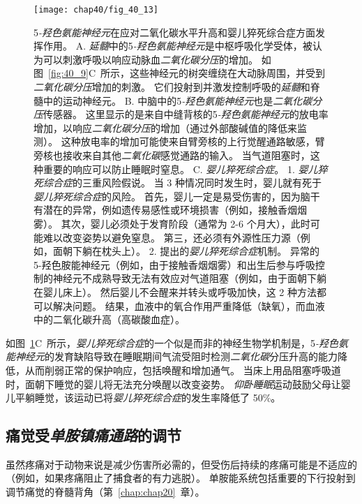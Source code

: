 \begin{figure}[htbp]
	\centering
	\texttt{[image: chap40/fig\_40\_13]}
	\caption{5\textit{-羟色氨能神经元}在应对二氧化碳水平升高和婴儿猝死综合症方面发挥作用。
		A. \textit{延髓}中的5\textit{-羟色氨能神经元}是中枢呼吸化学受体，被认为可以刺激呼吸以响应动脉血\textit{二氧化碳分压}的增加。
		如图~\ref{fig:40_9}C~所示，这些神经元的树突缠绕在大动脉周围，并受到\textit{二氧化碳分压}增加的刺激。
		它们投射到并激发控制呼吸的\textit{延髓}和脊髓中的运动神经元。
		B. 中脑中的5\textit{-羟色氨能神经元}也是\textit{二氧化碳分压}传感器。
		这里显示的是来自中缝背核的5\textit{-羟色氨能神经元}的放电率增加，以响应\textit{二氧化碳分压}的增加（通过外部酸碱值的降低来监测）。
		这种放电率的增加可能使来自臂旁核的上行觉醒通路敏感，臂旁核也接收来自其他\textit{二氧化碳}感觉通路的输入。
		当气道阻塞时，这种重要的响应可以防止睡眠时窒息\cite{richerson2004serotonergic}。
		C. \textit{婴儿猝死综合症}。
		1. \textit{婴儿猝死综合症}的三重风险假说。
		当 3 种情况同时发生时，婴儿就有死于\textit{婴儿猝死综合症}的风险。
		首先，婴儿一定是易受伤害的，因为脑干有潜在的异常，例如遗传易感性或环境损害（例如，接触香烟烟雾）。
		其次，婴儿必须处于发育阶段（通常为 2-6 个月大），此时可能难以改变姿势以避免窒息。
		第三，还必须有外源性压力源（例如，面朝下躺在枕头上）\cite{filiano1994perspective}。
		2. 提出的\textit{婴儿猝死综合症}机制。
		异常的 5-羟色胺能神经元（例如，由于接触香烟烟雾）和出生后参与呼吸控制的神经元不成熟导致无法有效应对气道阻塞（例如，由于面朝下躺在婴儿床上）。
		然后婴儿不会醒来并转头或呼吸加快，这 2 种方法都可以解决问题。
		结果，血液中的氧合作用严重降低（缺氧），而血液中的二氧化碳升高（高碳酸血症）。}
	\label{fig:40_13}
\end{figure}


如图~\ref{fig:40_13}C~所示，\textit{婴儿猝死综合症}的一个似是而非的神经生物学机制是，5\textit{-羟色氨能神经元}的发育缺陷导致在睡眠期间气流受阻时检测\textit{二氧化碳}分压升高的能力降低，从而削弱正常的保护响应，包括唤醒和增加通气。
当床上用品阻塞呼吸道时，面朝下睡觉的婴儿将无法充分唤醒以改变姿势。
\textit{仰卧睡眠}运动鼓励父母让婴儿平躺睡觉，该运动已将\textit{婴儿猝死综合症}的发生率降低了 50\%。



\subsection{痛觉受\textit{单胺镇痛通路}的调节}

虽然疼痛对于动物来说是减少伤害所必需的，但受伤后持续的疼痛可能是不适应的（例如，如果疼痛阻止了捕食者的有力逃脱）。
单胺能系统包括重要的下行投射到调节痛觉的脊髓背角（第~\ref{chap:chap20}~章）。


